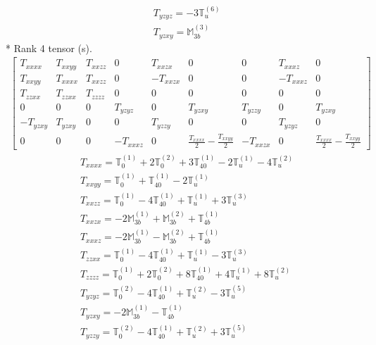 \documentclass[fleqn,8pt,landscape]{jsarticle}
\begin{document}
\begin{align*}
& T_{yzyz} = - 3 \mathbb{T}_{u}^{(6)} \\
& T_{yzxy} = \mathbb{M}_{3b}^{(3)}
\end{align*}
* Rank 4 tensor (s).
\begin{align*}
\begin{bmatrix} T_{xxxx} & T_{xxyy} & T_{xxzz} & 0 & T_{xxzx} & 0 & 0 & T_{xxxz} & 0 \\ T_{xxyy} & T_{xxxx} & T_{xxzz} & 0 & - T_{xxzx} & 0 & 0 & - T_{xxxz} & 0 \\ T_{zzxx} & T_{zzxx} & T_{zzzz} & 0 & 0 & 0 & 0 & 0 & 0 \\ 0 & 0 & 0 & T_{yzyz} & 0 & T_{yzxy} & T_{yzzy} & 0 & T_{yzxy} \\ - T_{yzxy} & T_{yzxy} & 0 & 0 & T_{yzzy} & 0 & 0 & T_{yzyz} & 0 \\ 0 & 0 & 0 & - T_{xxxz} & 0 & \frac{T_{xxxx}}{2} - \frac{T_{xxyy}}{2} & - T_{xxzx} & 0 & \frac{T_{xxxx}}{2} - \frac{T_{xxyy}}{2} \end{bmatrix}
\end{align*}
\begin{align*}
& T_{xxxx} = \mathbb{T}_{0}^{(1)} + 2 \mathbb{T}_{0}^{(2)} + 3 \mathbb{T}_{40}^{(1)} - 2 \mathbb{T}_{u}^{(1)} - 4 \mathbb{T}_{u}^{(2)} \\
& T_{xxyy} = \mathbb{T}_{0}^{(1)} + \mathbb{T}_{40}^{(1)} - 2 \mathbb{T}_{u}^{(1)} \\
& T_{xxzz} = \mathbb{T}_{0}^{(1)} - 4 \mathbb{T}_{40}^{(1)} + \mathbb{T}_{u}^{(1)} + 3 \mathbb{T}_{u}^{(3)} \\
& T_{xxzx} = - 2 \mathbb{M}_{3b}^{(1)} + \mathbb{M}_{3b}^{(2)} + \mathbb{T}_{4b}^{(1)} \\
& T_{xxxz} = - 2 \mathbb{M}_{3b}^{(1)} - \mathbb{M}_{3b}^{(2)} + \mathbb{T}_{4b}^{(1)} \\
& T_{zzxx} = \mathbb{T}_{0}^{(1)} - 4 \mathbb{T}_{40}^{(1)} + \mathbb{T}_{u}^{(1)} - 3 \mathbb{T}_{u}^{(3)} \\
& T_{zzzz} = \mathbb{T}_{0}^{(1)} + 2 \mathbb{T}_{0}^{(2)} + 8 \mathbb{T}_{40}^{(1)} + 4 \mathbb{T}_{u}^{(1)} + 8 \mathbb{T}_{u}^{(2)} \\
& T_{yzyz} = \mathbb{T}_{0}^{(2)} - 4 \mathbb{T}_{40}^{(1)} + \mathbb{T}_{u}^{(2)} - 3 \mathbb{T}_{u}^{(5)} \\
& T_{yzxy} = - 2 \mathbb{M}_{3b}^{(1)} - \mathbb{T}_{4b}^{(1)} \\
& T_{yzzy} = \mathbb{T}_{0}^{(2)} - 4 \mathbb{T}_{40}^{(1)} + \mathbb{T}_{u}^{(2)} + 3 \mathbb{T}_{u}^{(5)}
\end{align*}
\end{document}
